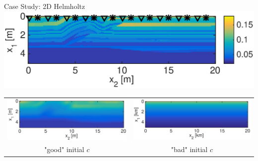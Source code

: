 \documentclass{beamer}
\begin{document}
\begin{frame}{Case Study: 2D Helmholtz}
\centering
\includegraphics[scale=0.5]{./figs/2D_overthrust1_a.eps}\\
\begin{tabular}{cc}
\includegraphics[scale=0.3]{./figs/2D_overthrust1_f.eps}&
\includegraphics[scale=0.3]{./figs/2D_overthrust2_f.eps}\\
"good" initial $c$ & "bad" initial $c$
\end{tabular}
\end{frame}
\end{document}
